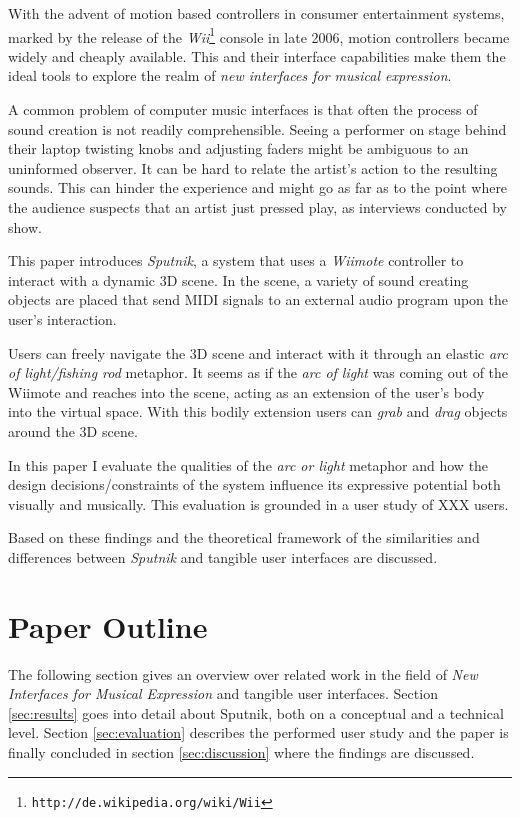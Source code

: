 \documentclass[10pt,a4paper]{scrartcl}
\begin{document}
With the advent of motion based controllers in consumer entertainment systems, marked by the release of the \emph{Wii}\footnote{\texttt{http://de.wikipedia.org/wiki/Wii}} console in late 2006, motion controllers became widely and cheaply available. This and their interface capabilities make them the ideal tools to explore the realm of \emph{new interfaces for musical expression}.


A common problem of computer music interfaces is that often the process of sound creation is not readily comprehensible. Seeing a performer on stage behind their laptop twisting knobs and adjusting faders might be ambiguous to an uninformed observer. It can be hard to relate the artist's action to the resulting sounds. This can hinder the experience and might go as far as to the point where the audience suspects that an artist just pressed play, as interviews conducted by \cite{Pedersen2009} show.

This paper introduces \emph{Sputnik}, a system that uses a \emph{Wiimote} controller to interact with a dynamic 3D scene. In the scene, a variety of sound creating objects are placed that send MIDI signals to an external audio program upon the user's interaction. 

Users can freely navigate the 3D scene and interact with it through an elastic \emph{arc of light/fishing rod} metaphor. It seems as if the \emph{arc of light} was coming out of the Wiimote and reaches into the scene, acting as an extension of the user's body into the virtual space. With this bodily extension users can \emph{grab} and \emph{drag} objects around the 3D scene.



In this paper I evaluate the qualities of the \emph{arc or light} metaphor and how the design decisions/constraints of the system influence its expressive potential both visually and musically. This evaluation is grounded in a user study of XXX users.

Based on these findings and the theoretical framework of \cite{Ullmer2000} the similarities and differences between \emph{Sputnik} and tangible user interfaces are discussed. 


\section{Paper Outline}
The following section gives an overview over related work in the field of \emph{New Interfaces for Musical Expression} and tangible user interfaces. Section \ref{sec:results} goes into detail about Sputnik, both on a conceptual and a technical level. Section \ref{sec:evaluation} describes the performed user study and the paper is finally concluded in section \ref{sec:discussion} where the findings are discussed.
\end{document}

